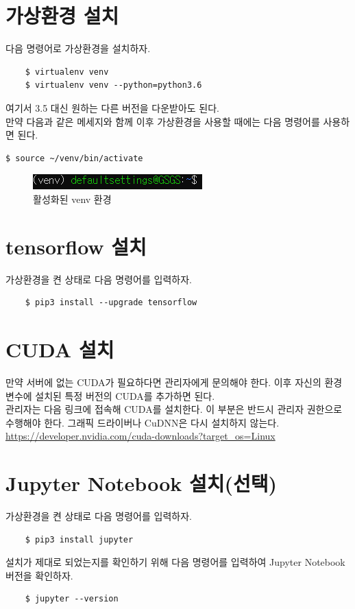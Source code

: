 \section{가상환경 설치}
다음 명령어로 가상환경을 설치하자. 
\begin{lstlisting}
    $ virtualenv venv
    $ virtualenv venv --python=python3.6
\end{lstlisting}
여기서 3.5 대신 원하는 다른 버전을 다운받아도 된다. \\
만약 다음과 같은 메세지와 함께 
이후 가상환경을 사용할 때에는 다음 명령어를 사용하면 된다.
\begin{lstlisting}[language=bash]
    $ source ~/venv/bin/activate
\end{lstlisting}
\begin{figure}[H]
	\begin{center}
        \includegraphics[width=0.6\linewidth]{venv}
        \caption{활성화된 venv 환경}
    \end{center}
    \end{figure}
\section{tensorflow 설치}
가상환경을 켠 상태로 다음 명령어를 입력하자.
\begin{lstlisting}
    $ pip3 install --upgrade tensorflow
\end{lstlisting}
\section{CUDA 설치}
만약 서버에 없는 \acs{CUDA}가 필요하다면 관리자에게 문의해야 한다. 이후 자신의 환경변수에 설치된 특정 버전의 \acs{CUDA}를 추가하면 된다.~\\


관리자는 다음 링크에 접속해 \acs{CUDA}를 설치한다. 이 부분은 반드시 관리자 권한으로 수행해야 한다. 그래픽 드라이버나 CuDNN은 다시 설치하지 않는다.\\
    \url{https://developer.nvidia.com/cuda-downloads?target_os=Linux}
\section{Jupyter Notebook 설치(선택)}
가상환경을 켠 상태로 다음 명령어를 입력하자.
\begin{lstlisting}
    $ pip3 install jupyter
\end{lstlisting}
설치가 제대로 되었는지를 확인하기 위해 다음 명령어를 입력하여 Jupyter Notebook 버전을 확인하자.
\begin{lstlisting}
    $ jupyter --version
\end{lstlisting}

